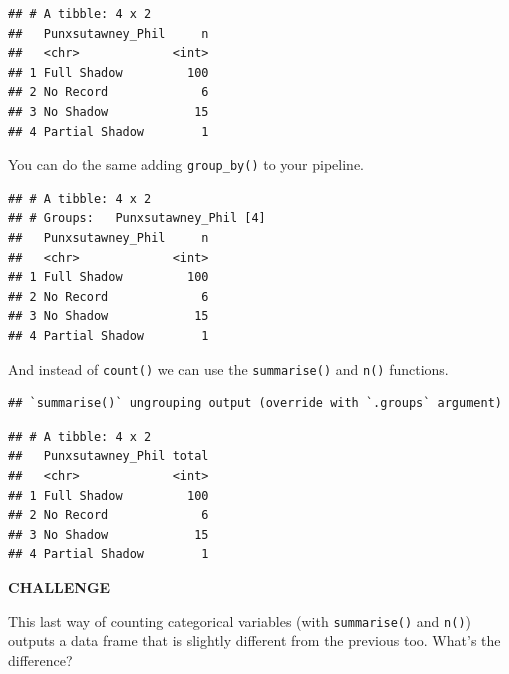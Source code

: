 \documentclass[
]{book}
\newenvironment{Shaded}{\begin{snugshade}}{\end{snugshade}}
\newcommand{\DataTypeTok}[1]{\textcolor[rgb]{0.13,0.29,0.53}{#1}}
\newcommand{\KeywordTok}[1]{\textcolor[rgb]{0.13,0.29,0.53}{\textbf{#1}}}
\newcommand{\NormalTok}[1]{#1}
\newcommand{\OperatorTok}[1]{\textcolor[rgb]{0.81,0.36,0.00}{\textbf{#1}}}
\newcommand{\StringTok}[1]{\textcolor[rgb]{0.31,0.60,0.02}{#1}}
\begin{document}
\begin{verbatim}
## # A tibble: 4 x 2
##   Punxsutawney_Phil     n
##   <chr>             <int>
## 1 Full Shadow         100
## 2 No Record             6
## 3 No Shadow            15
## 4 Partial Shadow        1
\end{verbatim}

You can do the same adding \texttt{group\_by()} to your pipeline.

\begin{Shaded}
\end{Shaded}

\begin{verbatim}
## # A tibble: 4 x 2
## # Groups:   Punxsutawney_Phil [4]
##   Punxsutawney_Phil     n
##   <chr>             <int>
## 1 Full Shadow         100
## 2 No Record             6
## 3 No Shadow            15
## 4 Partial Shadow        1
\end{verbatim}

And instead of \texttt{count()} we can use the \texttt{summarise()} and \texttt{n()} functions.

\begin{Shaded}
\end{Shaded}

\begin{verbatim}
## `summarise()` ungrouping output (override with `.groups` argument)
\end{verbatim}

\begin{verbatim}
## # A tibble: 4 x 2
##   Punxsutawney_Phil total
##   <chr>             <int>
## 1 Full Shadow         100
## 2 No Record             6
## 3 No Shadow            15
## 4 Partial Shadow        1
\end{verbatim}

\textbf{CHALLENGE}

This last way of counting categorical variables (with \texttt{summarise()} and \texttt{n()}) outputs a data frame that is slightly different from the previous too. What's the difference?
\end{document}
